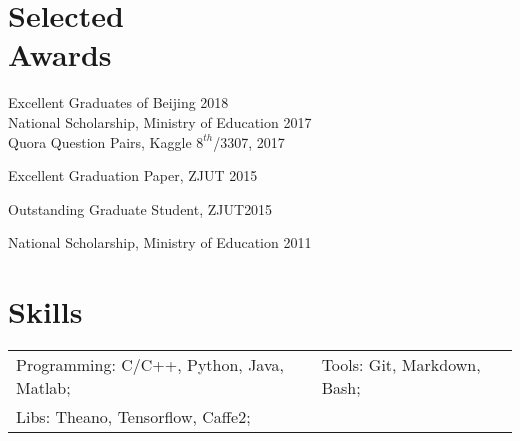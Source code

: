 \documentclass[margin,line]{resume}
\begin{document}
\begin{resume}
%




\section{Selected \\ Awards}
Excellent Graduates of Beijing \hfill {2018} \\
National Scholarship, Ministry of Education \hfill {2017}\\
Quora Question Pairs, Kaggle \hfill {$8^{th}$/3307, 2017}


Excellent Graduation Paper, ZJUT \hfill {2015}

Outstanding Graduate Student, ZJUT\hfill {2015}


National Scholarship, Ministry of Education \hfill {2011}



%
%
%

\section{ Skills}
\begin{tabular}{@{}p{3.2in}p{4in}}
Programming: C/C++, Python, Java, Matlab;& Tools: Git, Markdown, Bash; \\
Libs: Theano, Tensorflow, Caffe2;
\end{tabular}


\end{resume}
\end{document}
